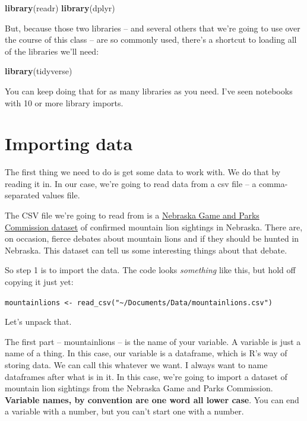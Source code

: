 \documentclass[]{book}
\newenvironment{Shaded}{\begin{snugshade}}{\end{snugshade}}
\newcommand{\KeywordTok}[1]{\textcolor[rgb]{0.13,0.29,0.53}{\textbf{#1}}}
\newcommand{\NormalTok}[1]{#1}
\begin{document}
\begin{Shaded}
\begin{Highlighting}[]
\KeywordTok{library}\NormalTok{(readr)}
\KeywordTok{library}\NormalTok{(dplyr)}
\end{Highlighting}
\end{Shaded}

But, because those two libraries -- and several others that we're going to use over the course of this class -- are so commonly used, there's a shortcut to loading all of the libraries we'll need:

\begin{Shaded}
\begin{Highlighting}[]
\KeywordTok{library}\NormalTok{(tidyverse)}
\end{Highlighting}
\end{Shaded}

You can keep doing that for as many libraries as you need. I've seen notebooks with 10 or more library imports.

\hypertarget{importing-data}{%
\section{Importing data}\label{importing-data}}

The first thing we need to do is get some data to work with. We do that by reading it in. In our case, we're going to read data from a csv file -- a comma-separated values file.

The CSV file we're going to read from is a \href{https://unl.box.com/s/xjipgkesl9rjmng4weg77vb73xt41apf}{Nebraska Game and Parks Commission dataset} of confirmed mountain lion sightings in Nebraska. There are, on occasion, fierce debates about mountain lions and if they should be hunted in Nebraska. This dataset can tell us some interesting things about that debate.

So step 1 is to import the data. The code looks \emph{something} like this, but hold off copying it just yet:

\texttt{mountainlions\ \textless{}-\ read\_csv("\textasciitilde{}/Documents/Data/mountainlions.csv")}

Let's unpack that.

The first part -- mountainlions -- is the name of your variable. A variable is just a name of a thing. In this case, our variable is a dataframe, which is R's way of storing data. We can call this whatever we want. I always want to name dataframes after what is in it. In this case, we're going to import a dataset of mountain lion sightings from the Nebraska Game and Parks Commission. \textbf{Variable names, by convention are one word all lower case}. You can end a variable with a number, but you can't start one with a number.
\end{document}
